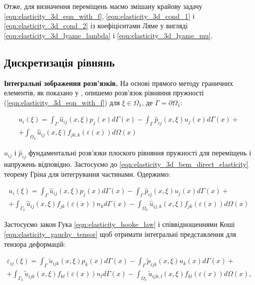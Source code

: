 Отже, для визначення переміщень маємо змішану крайову задачу \ref{eqn:elasticity_3d_eqn_with_f},
\ref{eqn:elasticity_3d_cond_1} і \ref{eqn:elasticity_3d_cond_2} із коефіцієнтами Ляме у вигляді
\ref{eqn:elasticity_3d_lyame_lambda} і \ref{eqn:elasticity_3d_lyame_mu}.

\subsection{Дискретизація рівнянь}

\textbf{Інтегральні зображення розв'язків.} На основі прямого методу граничних елементів, як показано у
\cite{brebbia-bem}, опишемо розв'язок рівняння пружності (\ref{eqn:elasticity_3d_eqn_with_f}) для $\xi \in \Omega_1$, де
$\Gamma = \partial\Omega_1$:

\begin{equation}
    \label{eqn:elasticity_3d_bem_direct_elasticity}
    \begin{split}
    u_i(\xi) = \int_{\Gamma}\hat{u}_{ij}(x,\xi)p_j(x)d\Gamma(x) - \int_{\Gamma}\hat{p}_{ij}(x,\xi)u_j(x)d\Gamma(x) + \\  
        + \int_{\Omega_3} \hat{u}_{ij}(x,\xi)f_{jk,k}(\varepsilon(x))d\Omega(x)
    \end{split}
\end{equation}

\noindent$\hat{u}_{ij}$ і $\hat{p}_{ij}$ фундаментальні розв'язки плоского рівняння пружності для переміщень і напружень 
відповідно. Застосуємо до \ref{eqn:elasticity_3d_bem_direct_elasticity} теорему Гріна для інтегрування частинами. 
Одержимо:

\begin{equation}
    \label{eqn:elasticity_3d_bem_direct_elasticity_simplified}
    \begin{split}
    u_i(\xi) = \int_{\Gamma}\hat{u}_{ij}(x,\xi)p_j(x)d\Gamma(x) - \int_{\Gamma}\hat{p}_{ij}(x,\xi)u_j(x)d\Gamma(x) + \\ 
        + \int_{\Gamma_3} \hat{u}_{ij}(x,\xi)f_{jk}(\varepsilon(x))n_kd\Gamma(x)
        - \int_{\Omega_3} \hat{u}_{ij,k}(x,\xi)f_{jk}(\varepsilon(x))d\Omega(x)
    \end{split}
\end{equation}

Застосуємо закон Гука \ref{eqn:elasticity_hooke_law} і співвідношеннями Коші \ref{eqn:elasticity_gauchy_tensor} щоб 
отримати інтегральні представлення для тензора деформацій:

\begin{equation}
    \label{eqn:elasticity_3d_bem_direct_gauchy_tensor}
    \begin{split}
    \varepsilon_{ij}(\xi) = \int_{\Gamma}\tilde{u}_{ijk}(x,\xi)p_k(x)d\Gamma(x) 
        - \int_{\Gamma}\tilde{p}_{ijk}(x,\xi)u_k(x)d\Gamma(x) + \\ 
        + \int_{\Gamma_3} \tilde{u}_{ijk}(x,\xi)f_{kl}(\varepsilon(x))n_l d\Gamma(x)
        - \int_{\Omega_3} \tilde{u}_{ijk,l}(x,\xi)f_{kl}(\varepsilon(x))d\Omega(x),
    \end{split}
\end{equation}

